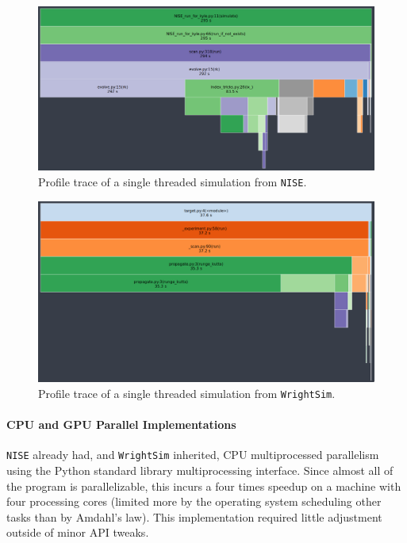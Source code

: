 \begin{landscape}
\begin{figure}
\centering
	\includegraphics[width=8in]{simulation/images/NISE_prof.png}
\caption{Profile trace of a single threaded simulation from
\texttt{NISE}. \label{sim:fig:snakeviz}}
\end{figure}
\end{landscape}

\begin{landscape}
\begin{figure}
\centering
	\includegraphics[width=8in]{simulation/images/WrightSim_prof.png}
\caption{Profile trace of a single threaded simulation from
\texttt{WrightSim}. \label{sim:fig:snakeviz2}}
\end{figure}
\end{landscape}

\hypertarget{cpu-and-gpu-parallel-implementations}{%
\paragraph{CPU and GPU Parallel
Implementations}\label{cpu-and-gpu-parallel-implementations}}

\texttt{NISE} already had, and \texttt{WrightSim} inherited, CPU
multiprocessed parallelism using the Python standard library
multiprocessing interface. Since almost all of the program is
parallelizable, this incurs a four times speedup on a machine with four
processing cores (limited more by the operating system scheduling other
tasks than by Amdahl's law). This implementation required little
adjustment outside of minor API tweaks.

